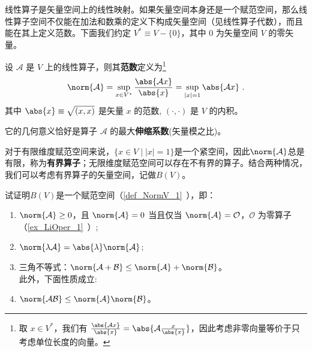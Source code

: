 

线性算子是矢量空间上的线性映射。如果矢量空间本身还是一个赋范空间，那么线性算子空间不仅能在加法和数乘的定义下构成矢量空间（见线性算子代数），而且能在其上定义范数。下面我们约定 $V^* \equiv V - \{0\}$，其中 $0$ 为矢量空间 $V$ 的零矢量。

\begin{definition}{}\label{def_ONorm_1}
设 $\mathcal A$ 是 $V$ 上的线性算子，则其\textbf{范数}定义为\footnote{取 $x \in V^*$，我们有 $\frac{\abs{\mathcal A x}} {\abs{x}} = \abs{\mathcal{A} \frac{x}{\abs{x}} }$，因此考虑非零向量等价于只考虑单位长度的向量。}
\begin{equation}\label{eq_ONorm_1}
\norm{\mathcal A} = \sup_{x\in{V^*}}\frac{\abs{\mathcal Ax}}{\abs{x}} = \sup_{|x| = 1} \abs{\mathcal A x}~.
\end{equation}
其中 $\abs{x}\equiv\sqrt{(x,x)}$ 是矢量 $x$ 的范数, $(\cdot,\cdot)$ 是 $V$ 的内积。
\end{definition}
它的几何意义恰好是算子 $\mathcal A$ 的最大\textbf{伸缩系数}(矢量模之比)。


对于有限维度赋范空间来说，$\{x \in V \mid |x| = 1\}$是一个紧空间，因此$\norm{\mathcal A}$总是有限，称为\textbf{有界算子}；无限维度赋范空间可以存在不有界的算子。结合两种情况，我们可以考虑有界算子的矢量空间，记做$B(V)$。

\begin{example}{}
试证明$B(V)$是一个赋范空间（\autoref{def_NormV_1}~），即：
\begin{enumerate}
\item $\norm{\mathcal A}\geq0$，且 $\norm{\mathcal A}=0$ 当且仅当 $\norm{\mathcal A}=\mathcal O$，$\mathcal O$ 为零算子（\autoref{ex_LiOper_1}~）;
\item $\norm{\lambda \mathcal A}=\abs{\lambda}\norm{\mathcal A}$;
\item 三角不等式：$\norm{\mathcal A+\mathcal B}\leq\norm{\mathcal A}+\norm{\mathcal B}$。\\
此外，下面性质成立:\\
\item $\norm{\mathcal{AB}}\leq{\norm{\mathcal A}}\norm{\mathcal B}$。
\end{enumerate}
\end{example}


